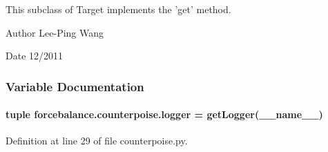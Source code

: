 This subclass of Target implements the 'get' method.

\begin{DoxyAuthor}{Author}
Lee-\/\-Ping Wang 
\end{DoxyAuthor}
\begin{DoxyDate}{Date}
12/2011 
\end{DoxyDate}


\subsubsection{Variable Documentation}
\hypertarget{namespaceforcebalance_1_1counterpoise_a9a7008a650c37185e7e43c9b1c943bd6}{
\paragraph[{logger}]{\setlength{\rightskip}{0pt plus 5cm}tuple forcebalance.\-counterpoise.\-logger = get\-Logger(\-\_\-\-\_\-name\-\_\-\-\_\-)}}\label{namespaceforcebalance_1_1counterpoise_a9a7008a650c37185e7e43c9b1c943bd6}


Definition at line 29 of file counterpoise.\-py.

